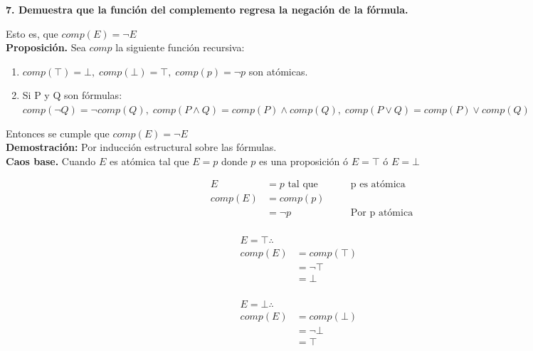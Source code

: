 \textbf{7. Demuestra que la función del complemento regresa la negación de la fórmula.}

Esto es, que $comp(E)=\neg E$\\
\textbf{Proposición.} Sea $comp$ la siguiente función recursiva:
\begin{enumerate}
	\item $comp(\top) = \bot,\;comp(\bot) = \top,\;comp(p) = \neg p$ son atómicas.
	\item Si P y Q son fórmulas: $comp(\neg Q) = \neg comp(Q),\;comp(P \land Q) = comp(P) \land comp(Q),\;comp(P \lor Q) = comp(P)\lor comp(Q)$
\end{enumerate}
\indent Entonces se cumple que $comp(E)=\neg E$
\noindent\\
\textbf{Demostración:} Por inducción estructural sobre las fórmulas.\\
\indent
\textbf{Caos base.} Cuando $E$ es atómica tal que $E=p$ donde $p$ es una proposición ó $E=\top$ ó $E=\bot$
\begin{multicols}{3}
	\begin{alignat*}{2}
		E       & = p \text{ tal que } & \quad & \text{p es atómica}  \\
		comp(E) & = comp(p)                                           \\
		        & = \neg p             & \quad & \text{Por p atómica} \\
	\end{alignat*}

	\begin{alignat*}{2}
		E=\top\therefore                         \\
		comp(E) & = comp(\top)                   \\
		        & = \neg \top  & \quad & \text{} \\
		        & = \bot       & \quad & \text{} \\
	\end{alignat*}

	\begin{alignat*}{2}
		E=\bot\therefore                         \\
		comp(E) & = comp(\bot)                   \\
		        & =\neg \bot   & \quad & \text{} \\
		        & =\top        & \quad & \text{} \\
	\end{alignat*}
\end{multicols}

